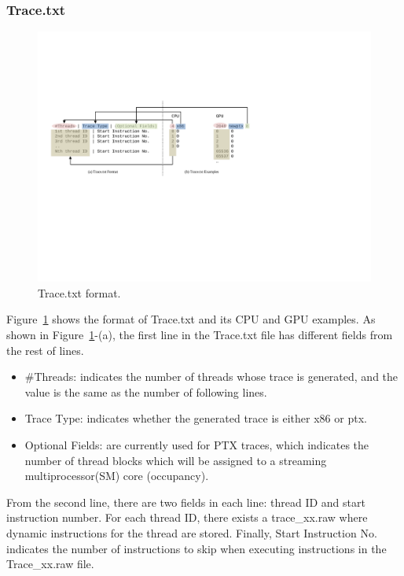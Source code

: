 \subsubsection{Trace.txt}
\begin{figure}[htb]
\centering
\includegraphics{figs/trace_format}
\caption{Trace.txt format.}
\label{fig:trace_format}
\end{figure}

Figure~\ref{fig:trace_format} shows the format of Trace.txt and its CPU and GPU
examples.  As shown in Figure~\ref{fig:trace_format}-(a), the first line in the
Trace.txt file has different fields from the rest of lines.

\begin{itemize}\itemsep2pt
\item \#Threads: indicates the number of threads whose trace is generated, and the value 
is the same as the number of following lines. 
\item Trace Type: indicates whether the generated trace is either x86 or ptx.
\item Optional Fields: are currently used for PTX traces, which indicates the number of thread blocks
which will be assigned to a streaming multiprocessor(SM) core (occupancy).
\end{itemize}

From the second line, there are two fields in each line: thread ID and start
instruction number.  For each thread ID, there exists a trace\_xx.raw where
dynamic instructions for the thread are stored. Finally, Start Instruction No.
indicates the number of instructions to skip when executing instructions in the
Trace\_xx.raw file.

